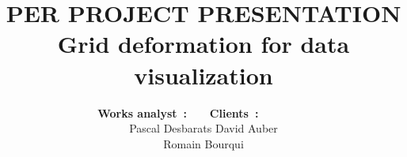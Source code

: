 
\def\presentation{PER PROJECT PRESENTATION}
\def\bottomTitle{PER PROJECT}
\def\noteAboutAuthor{Engeneering students/ENSEIRB-MATMECA}
\def\subject{Grid deformation for data visualization}

\title[\bottomTitle]{
        {\bfseries \huge \presentation\\} 
        {\bfseries \subject}
}


\author[\noteAboutAuthor]{    
  {\normalsize \bfseries \sffamily Works analyst~:~~~} 
  \hspace{3cm}
  {\normalsize \bfseries \sffamily Clients~:~~~~~~~~}\\
  [0.06cm]
  Pascal {\sc Desbarats}
  \hspace{3cm}
  David {\sc Auber}\\
  \hspace{7cm}
  Romain {\sc Bourqui}\\    
}

